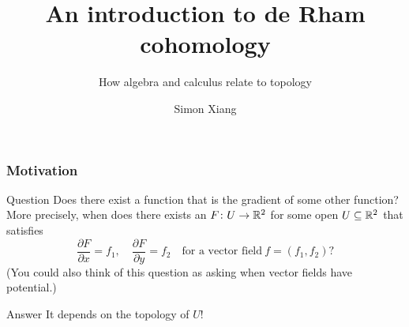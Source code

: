 \documentclass[xcolor=dvipsnames]{beamer}
\title{An introduction to de Rham cohomology}
\subtitle{How algebra and calculus relate to topology}
\author{Simon Xiang}
\institute{University of Texas at Austin}
\begin{document}
 
    \begin{frame}
        \titlepage
    \end{frame}


    \begin{frame}
        \frametitle{Motivation} 
        \begin{exampleblock}{Question} 
            Does there exist a function that is the gradient of some other function? More precisely, when does there exists an $F \colon U \to \mathbb{R}^2$ for some open $U \subseteq \mathbb{R}^2$ that satisfies \[
                \frac{\partial F}{\partial x}=f_1,\quad \frac{\partial F}{\partial y}=f_2 \quad \text{for a vector field} \ f=(f_1,f_2)?
            \] (You could also think of this question as asking when vector fields have potential.)
        \end{exampleblock}\pause
        \begin{exampleblock}{Answer} 
           It depends on the topology of $U$! 
        \end{exampleblock}
    \end{frame}
    
\end{document}
